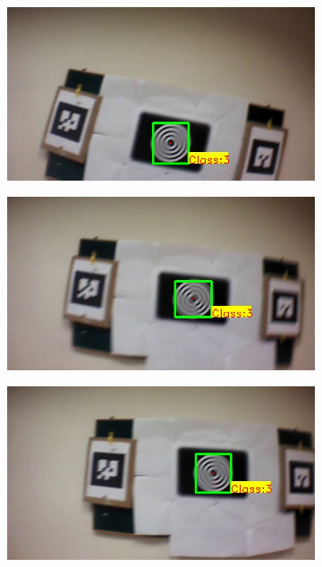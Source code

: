 \begin{figure}[ht!]
\begin{subfigure}[b]{.19\textwidth}
\end{subfigure}
\begin{subfigure}[b]{.19\textwidth}
\includegraphics[width=\linewidth]{figures/fiducial/BLUT_input_11/output3.jpg}
\end{subfigure}
\begin{subfigure}[b]{.19\textwidth}
\includegraphics[width=\linewidth]{figures/fiducial/BLUT_input_11/output4.jpg}
\end{subfigure}
\begin{subfigure}[b]{.19\textwidth}
\includegraphics[width=\linewidth]{figures/fiducial/BLUT_input_11/output5.jpg}

\end{subfigure}
\end{figure}

